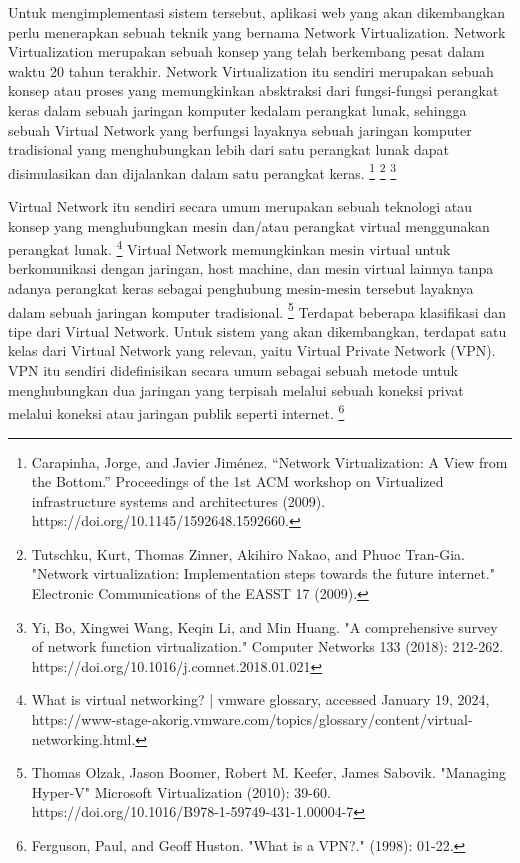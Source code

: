 Untuk mengimplementasi sistem tersebut, aplikasi web yang akan dikembangkan perlu menerapkan sebuah teknik yang bernama Network 
Virtualization. Network Virtualization merupakan sebuah konsep yang telah berkembang pesat dalam waktu 20 tahun terakhir. Network 
Virtualization itu sendiri merupakan sebuah konsep atau proses yang memungkinkan absktraksi dari fungsi-fungsi perangkat keras dalam 
sebuah jaringan komputer kedalam perangkat lunak, sehingga sebuah Virtual Network yang berfungsi layaknya sebuah jaringan komputer 
tradisional yang menghubungkan lebih dari satu perangkat lunak dapat disimulasikan dan dijalankan dalam satu perangkat keras. 
\footnote{Carapinha, Jorge, and Javier Jiménez. “Network Virtualization: A View from the Bottom.” Proceedings of the 1st ACM workshop on Virtualized infrastructure systems and architectures (2009). https://doi.org/10.1145/1592648.1592660. }
\footnote{Tutschku, Kurt, Thomas Zinner, Akihiro Nakao, and Phuoc Tran-Gia. "Network virtualization: Implementation steps towards the future internet." Electronic Communications of the EASST 17 (2009).}
\footnote{Yi, Bo, Xingwei Wang, Keqin Li, and Min Huang. "A comprehensive survey of network function virtualization." Computer Networks 133 (2018): 212-262. https://doi.org/10.1016/j.comnet.2018.01.021}
\par

Virtual Network itu sendiri secara umum merupakan sebuah teknologi atau konsep yang menghubungkan mesin dan/atau perangkat virtual 
menggunakan perangkat lunak. 
\footnote{What is virtual networking? | vmware glossary, accessed January 19, 2024, https://www-stage-akorig.vmware.com/topics/glossary/content/virtual-networking.html.} 
Virtual Network memungkinkan mesin virtual untuk berkomunikasi dengan jaringan, host machine, dan mesin virtual lainnya tanpa adanya perangkat keras sebagai penghubung mesin-mesin tersebut layaknya dalam sebuah jaringan komputer tradisional. 
\footnote{Thomas Olzak, Jason Boomer, Robert M. Keefer, James Sabovik. "Managing Hyper-V" Microsoft Virtualization (2010): 39-60. https://doi.org/10.1016/B978-1-59749-431-1.00004-7} 
Terdapat beberapa klasifikasi dan tipe dari Virtual Network. Untuk sistem yang akan dikembangkan, terdapat satu kelas dari Virtual Network yang relevan, yaitu Virtual Private Network (VPN).
VPN itu sendiri didefinisikan secara umum sebagai sebuah metode untuk menghubungkan dua jaringan yang terpisah melalui sebuah koneksi privat melalui koneksi atau jaringan publik seperti internet.
\footnote{Ferguson, Paul, and Geoff Huston. "What is a VPN?." (1998): 01-22.}
\par

